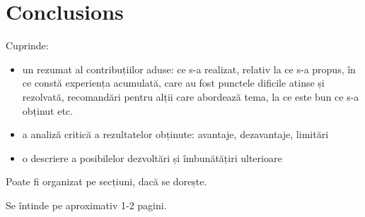 
\chapter{Conclusions}
\label{cap:concluzii}

Cuprinde:

\begin{itemize}
 \item un rezumat al contribuțiilor aduse: ce s-a realizat, relativ la ce s-a propus, în ce constă experiența acumulată, care au fost punctele dificile atinse și rezolvată, recomandări pentru alții care abordează tema, la ce este bun ce s-a obținut etc.
 
 \item a analiză critică a rezultatelor obținute: avantaje, dezavantaje, limitări
 
 \item o descriere a posibilelor dezvoltări și îmbunătățiri ulterioare
\end{itemize}

Poate fi organizat pe secțiuni, dacă se dorește.

Se întinde pe aproximativ 1-2 pagini. 






